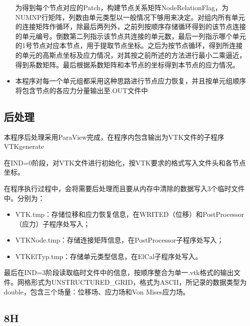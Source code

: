 \documentclass[UTF8]{ctexbook}
\begin{document}
\begin{itemize}
为得到每个节点对应的Patch，构建节点关系矩阵NodeRelationFlag，为NUMNP行矩阵，列数由单元类型以一般情况下够用来决定。对组内所有单元的连接矩阵作循环，除最后两列外，之前列按顺序存储循环得到的该节点连接的单元编号。倒数第二列指示该节点共连接的单元数，最后一列指示哪个单元的1号节点对应本节点，用于提取节点坐标。之后为按节点循环，得到所连接的单元的高斯点坐标及应力情况，对其按之前所述的方法进行最小二乘逼近，得到系数矩阵。最后根据系数矩阵和本节点的坐标得到本节点的应力情况。

\item 本程序对每一个单元组都采用这种思路进行节点应力恢复，并且按单元组顺序将包含节点的各应力分量输出至.OUT文件中
\end{itemize}

\subsection{后处理}
\item 本程序后处理采用ParaView完成，在程序内包含输出为VTK文件的子程序VTKgenerate

在IND=0阶段，对VTK文件进行初始化，按VTK要求的格式写入文件头和各节点坐标。

在程序执行过程中，会将需要后处理而且要从内存中清除的数据写入3个临时文件中。分别为：

\begin{itemize}
\item VTK.tmp：存储位移和应力恢复信息，在WRITED（位移）和PostProcessor（应力）子程序处写入；
\item VTKNode.tmp：存储连接矩阵信息，在PostProcessor子程序处写入；
\item VTKElTyp.tmp：存储单元类型信息，在ElCal子程序处写入。
\end{itemize}

最后在IND=3阶段读取临时文件中的信息，按顺序整合为单一.vtk格式的输出文件。网格形式为UNSTRUCTURED_GRID，格式为ASCII，所记录的数据类型为double，包含三个场量：位移场、应力场和Von Mises应力场。

\subsection{8H}
\end{document}
